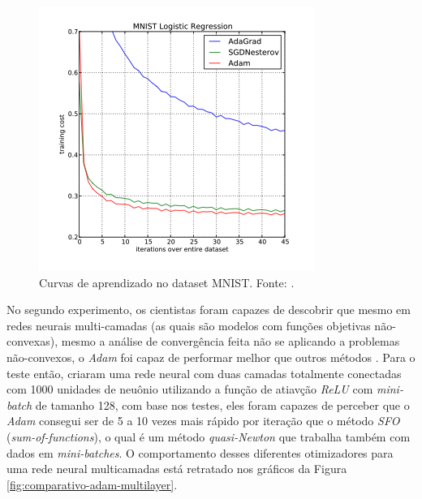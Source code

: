 \begin{figure}[h]
    \centering
    \includegraphics[width=0.65\linewidth]{../imagens/retropropagacao-gradiente/comparativo-adam-mnist.png}
    
    \caption[Curvas de aprendizado no dataset MNIST]{%
        Curvas de aprendizado no dataset MNIST.
        \newline
        \small Fonte: \parencite{AdamMethod}.
    }
    \label{fig:comparativo-adam-mnist}
\end{figure}

No segundo experimento, os cientistas foram capazes de descobrir que mesmo em redes neurais multi-camadas (as quais são modelos com funções objetivas não-convexas), mesmo a análise de convergência feita não se aplicando a problemas não-convexos, o \textit{Adam} foi capaz de performar melhor que outros métodos \parencite{AdamMethod}. Para o teste então, \textcite{AdamMethod} criaram uma rede neural com duas camadas totalmente conectadas com 1000 unidades de neuônio utilizando a função de atiavção \textit{ReLU} com \textit{mini-batch} de tamanho 128, com base nos testes, eles foram capazes de perceber que o \textit{Adam} consegui ser de 5 a 10 vezes mais rápido por iteração que o método \textit{SFO} (\textit{sum-of-functions}), o qual é um método \textit{quasi-Newton} que trabalha também com dados em \textit{mini-batches}. O comportamento desses diferentes otimizadores para uma rede neural multicamadas está retratado nos gráficos da Figura \ref{fig:comparativo-adam-multilayer}.

